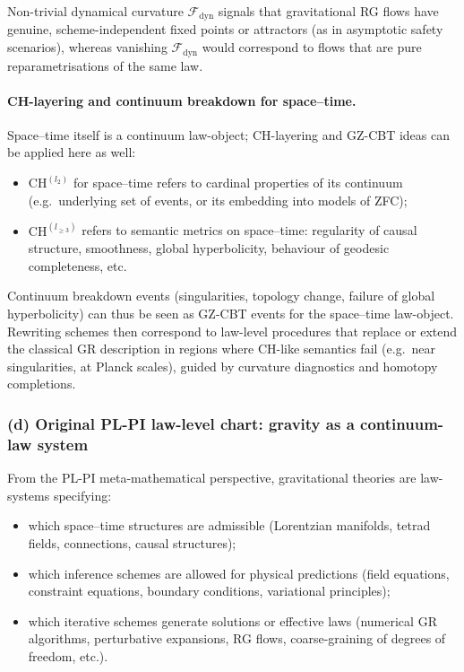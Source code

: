 \documentclass[11pt]{book}
\theoremstyle{plain}
\theoremstyle{definition}
\begin{document}
Non-trivial dynamical curvature $\mathcal{F}_{\mathrm{dyn}}$ signals
that gravitational RG flows have genuine, scheme-independent fixed
points or attractors (as in asymptotic safety scenarios), whereas
vanishing $\mathcal{F}_{\mathrm{dyn}}$ would correspond to flows that
are pure reparametrisations of the same law.

\paragraph{CH-layering and continuum breakdown for space--time.}

Space--time itself is a continuum law-object; CH-layering and GZ-CBT
ideas can be applied here as well:

\begin{itemize}
  \item $\mathrm{CH}^{(l_2)}$ for space--time refers to cardinal
        properties of its continuum (e.g.\ underlying set of events,
        or its embedding into models of ZFC);
  \item $\mathrm{CH}^{(l_{\ge3})}$ refers to semantic metrics on
        space--time: regularity of causal structure, smoothness,
        global hyperbolicity, behaviour of geodesic completeness, etc.
\end{itemize}

Continuum breakdown events (singularities, topology change, failure of
global hyperbolicity) can thus be seen as GZ-CBT events for the
space--time law-object. Rewriting schemes then correspond to law-level
procedures that replace or extend the classical GR description in
regions where CH-like semantics fail (e.g.\ near singularities, at
Planck scales), guided by curvature diagnostics and homotopy
completions.



\subsubsection*{(d) Original PL-PI law-level chart: gravity as a continuum-law system}

From the PL-PI meta-mathematical perspective, gravitational theories
are law-systems specifying:

\begin{itemize}
  \item which space--time structures are admissible (Lorentzian
        manifolds, tetrad fields, connections, causal structures);
  \item which inference schemes are allowed for physical predictions
        (field equations, constraint equations, boundary conditions,
        variational principles);
  \item which iterative schemes generate solutions or effective laws
        (numerical GR algorithms, perturbative expansions, RG flows,
        coarse-graining of degrees of freedom, etc.).
\end{itemize}
\end{document}
